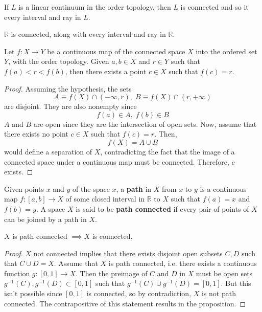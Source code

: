     \begin{theorem}
    If $L$ is a linear continuum in the order topology, then $L$ is connected and so it every interval and ray in $L$. 
    \end{theorem}

    \begin{corollary}
    $\mathbb{R}$ is connected, along with every interval and ray in $\mathbb{R}$. 
    \end{corollary}

    \begin{theorem}
    Let $f: X \longrightarrow Y$ be a continuous map of the connected space $X$ into the ordered set $Y$, with the order topology. Given $a, b \in X$ and $r \in Y$ such that $f(a)<r<f(b)$, then there exists a point $c \in X$ such that $f(c) = r$. 
    \end{theorem}
    \begin{proof}
    Assuming the hypothesis, the sets 
    \[A \equiv f(X) \cap (-\infty, r), \; B \equiv f(X) \cap (r, +\infty)\]
    are disjoint. They are also nonempty since 
    \[f(a) \in A, \; f(b) \in B\]
    $A$ and $B$ are open since they are the intersection of open sets. Now, assume that there exists no point $c \in X$ such that $f(c) = r$. Then, 
    \[f(X) = A \cup B\]
    would define a separation of $X$, contradicting the fact that the image of a connected space under a continuous map must be connected. Therefore, $c$ exists. 
    \end{proof}

    \begin{definition}
    Given points $x$ and $y$ of the space $x$, a \textbf{path} in $X$ from $x$ to $y$ is a continuous map $f: [a,b] \longrightarrow X$ of some closed interval in $\mathbb{R}$ to $X$ such that $f(a) = x$ and $f(b)=y$. A space $X$ is said to be \textbf{path connected} if every pair of points of $X$ can be joined by a path in $X$. 
    \end{definition}

    \begin{proposition}
    $X$ is path connected $\implies X$ is connected. 
    \end{proposition}
    \begin{proof}
    $X$ not connected implies that there exists disjoint open subsets $C, D$ such that $C \cup D = X$. Assume that $X$ is path connected, i.e. there exists a continuous function $g: [0,1] \longrightarrow X$. Then the preimage of $C$ and $D$ in $X$ must be open sets $g^{-1} (C), g^{-1} (D) \subset [0,1]$ such that $g^{-1}(C) \cup g^{-1}(D) = [0,1]$. But this isn't possible since $[0,1]$ is connected, so by contradiction, $X$ is not path connected. The contrapositive of this statement results in the proposition. 
    \end{proof}


